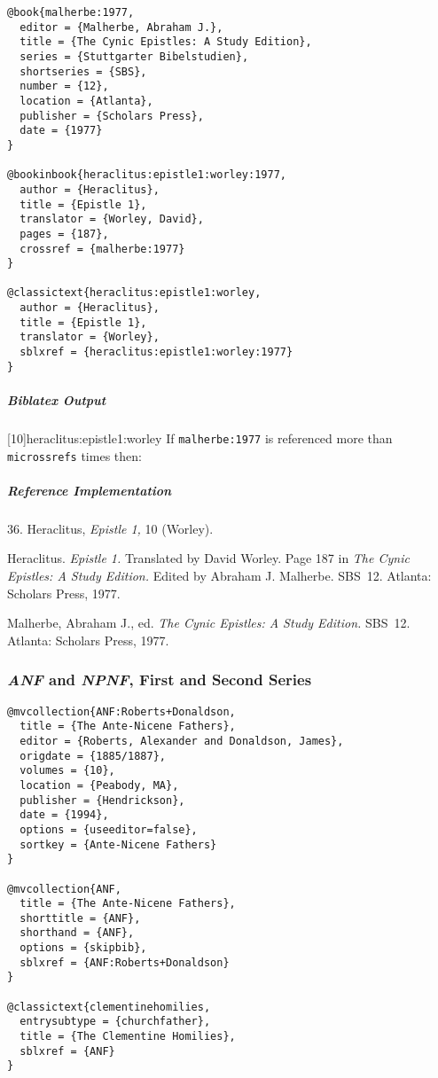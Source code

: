 \documentclass[a4paper]{article}
\newenvironment{biboutput}{%
  \subparagraph{Biblatex Output}
}{\color{black}}
\newenvironment{refimp}{%
  \subparagraph{Reference Implementation}
  \color{reference-colour}
  \rm
}{\par\color{black}}
\begin{document}
\begin{lstlisting}
@book{malherbe:1977,
  editor = {Malherbe, Abraham J.},
  title = {The Cynic Epistles: A Study Edition},
  series = {Stuttgarter Bibelstudien},
  shortseries = {SBS},
  number = {12},
  location = {Atlanta},
  publisher = {Scholars Press},
  date = {1977}
}

@bookinbook{heraclitus:epistle1:worley:1977,
  author = {Heraclitus},
  title = {Epistle 1},
  translator = {Worley, David},
  pages = {187},
  crossref = {malherbe:1977}
}

@classictext{heraclitus:epistle1:worley,
  author = {Heraclitus},
  title = {Epistle 1},
  translator = {Worley},
  sblxref = {heraclitus:epistle1:worley:1977}
}
\end{lstlisting}

\begin{biboutput}
  [10]{heraclitus:epistle1:worley}
  If \texttt{malherbe:1977} is referenced more than \texttt{microssrefs} times
  then:\par
\end{biboutput}

\begin{refimp}
  \hspace*{\bibindent}36. Heraclitus, \emph{Epistle 1,} 10 (Worley).

  \hangindent\bibindent Heraclitus. \emph{Epistle 1.} Translated by David
  Worley. Page 187 in \emph{The Cynic Epistles: A Study Edition.} Edited by
  Abraham J. Malherbe. SBS~12. Atlanta: Scholars Press, 1977.

  \hangindent\bibindent Malherbe, Abraham J., ed. \emph{The Cynic Epistles: A
  Study Edition.} SBS~12. Atlanta: Scholars Press, 1977.

\end{refimp}

\subsubsection{\emph{ANF} and \emph{NPNF}, First and Second Series}

\begin{lstlisting}
@mvcollection{ANF:Roberts+Donaldson,
  title = {The Ante-Nicene Fathers},
  editor = {Roberts, Alexander and Donaldson, James},
  origdate = {1885/1887},
  volumes = {10},
  location = {Peabody, MA},
  publisher = {Hendrickson},
  date = {1994},
  options = {useeditor=false},
  sortkey = {Ante-Nicene Fathers}
}

@mvcollection{ANF,
  title = {The Ante-Nicene Fathers},
  shorttitle = {ANF},
  shorthand = {ANF},
  options = {skipbib},
  sblxref = {ANF:Roberts+Donaldson}
} 

@classictext{clementinehomilies,
  entrysubtype = {churchfather},
  title = {The Clementine Homilies},
  sblxref = {ANF}
}
\end{lstlisting}
\end{document}
